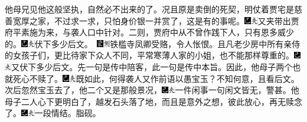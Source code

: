 他母兄见他这般坚执，自然必不出来的了。况且原是卖倒的死契，明仗着贾宅是慈善宽厚之家，不过求一求，只怕身价银一并赏了，这是有的事呢。{\includegraphics[width=3mm]{../Images/00003}\includegraphics[width=3mm]{../Images/00012}\footnotesize \kaishu 又夹带出贾府平素施为来，与袭人口中针对。}二则，贾府中从不曾作践下人，只有恩多威少的。{\includegraphics[width=3mm]{../Images/00003}\includegraphics[width=3mm]{../Images/00012}\footnotesize \kaishu 伏下多少后文。　\includegraphics[width=3mm]{../Images/00006}\includegraphics[width=3mm]{../Images/00011}\footnotesize \kaishu 铁槛寺凤卿受赂，令人怅恨。}且凡老少房中所有亲侍的女孩子们，更比待家下众人不同，平常寒薄人家的小姐，也不能那样尊重的。{\includegraphics[width=3mm]{../Images/00003}\includegraphics[width=3mm]{../Images/00012}\footnotesize \kaishu 又伏下多少后文。先一句是传中陪客，此一句是传中本旨。}因此，他母子两个也就死心不赎了。{\includegraphics[width=3mm]{../Images/00003}\includegraphics[width=3mm]{../Images/00012}\footnotesize \kaishu 既如此，何得袭人又作前语以愚宝玉？不知何意，且看后文。}次后忽然宝玉去了，他二个又是那般景况，{\includegraphics[width=3mm]{../Images/00003}\includegraphics[width=3mm]{../Images/00012}\footnotesize \kaishu 一件闲事一句闲文皆无，警甚。}他母子二人心下更明白了，越发石头落了地，而且是意外之想，彼此放心，再无赎念了。{\includegraphics[width=3mm]{../Images/00003}\includegraphics[width=3mm]{../Images/00012}\footnotesize \kaishu 一段情结。脂砚。}

